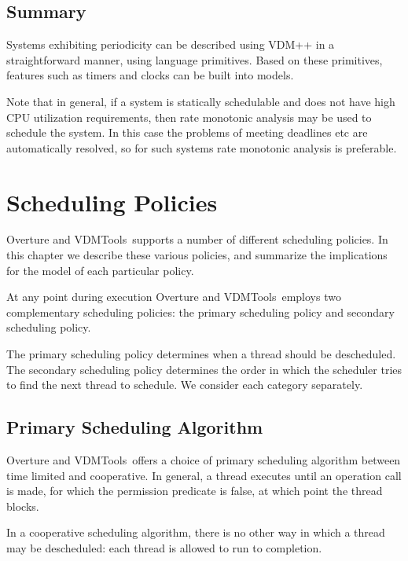 \documentclass{overturerepchap}
\newcommand{\vdmtools}{VDMTools}
\begin{document}
\section{Summary}

Systems exhibiting periodicity can be described using VDM++ in a
straightforward manner, using language primitives. Based on these
primitives, features such as timers and clocks can be built into
models.

Note that in general, if a system is statically schedulable and does
not have high CPU utilization requirements, then rate monotonic
analysis \cite{Audsley&93,Burns95} may be used to schedule the system. In
this case the problems of meeting deadlines etc are automatically
resolved, so for such systems rate monotonic analysis is preferable.


\chapter{Scheduling Policies} \label{chap:schedule}

Overture and \vdmtools\ supports a number of different scheduling
policies. In this chapter we describe these various policies, and
summarize the implications for the model of each particular policy.

At any point during execution Overture and \vdmtools\ employs two
complementary scheduling policies: the primary scheduling policy and
secondary scheduling policy.

The primary scheduling policy determines when a thread should be
descheduled. The secondary scheduling policy determines the order in
which the scheduler tries to find the next thread to schedule. We
consider each category separately.

\section{Primary Scheduling Algorithm}

Overture and \vdmtools\ offers a choice of primary scheduling algorithm
between time limited and cooperative. In general, a thread executes
until an operation call is made, for which the permission predicate is
false, at which point the thread blocks.

In a cooperative scheduling algorithm, there is no other way in which
a thread may be descheduled: each thread is allowed to run to
completion.
\end{document}
